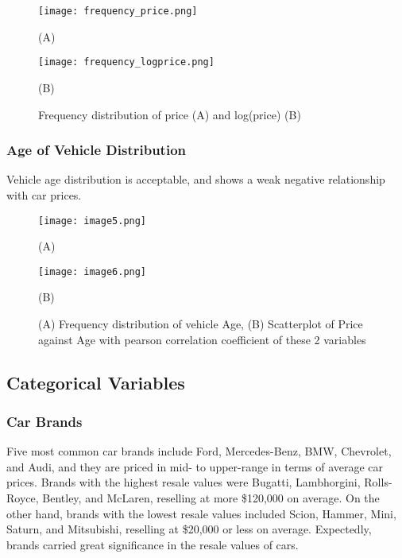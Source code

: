 \documentclass{article}
\begin{document}
\begin{figure}[H]    %
    \centering
    \begin{minipage}[b]{0.45\textwidth}
        \centering
        \texttt{[image: frequency\_price.png]}
        \centerline{(A)}
    \end{minipage}
    \hfill
    \begin{minipage}[b]{0.45\textwidth}
        \centering
        \texttt{[image: frequency\_logprice.png]}
        \centerline{(B)}
    \end{minipage}
    \caption{Frequency distribution of price (A) and log(price) (B)}
    \label{fig:price_dist}
\end{figure}

\subsubsection{Age of Vehicle Distribution}

Vehicle age distribution is acceptable, and shows a weak negative relationship with car prices.

\begin{figure}[H]    %
   \centering
   \begin{minipage}[b]{0.45\textwidth}
       \centering
       \texttt{[image: image5.png]}
       \centerline{(A)}
   \end{minipage}
   \hfill
   \begin{minipage}[b]{0.45\textwidth}
       \centering
       \texttt{[image: image6.png]}  %
       \centerline{(B)}
   \end{minipage}
   \caption{(A) Frequency distribution of vehicle Age, (B) Scatterplot of Price against Age with pearson correlation coefficient of these 2 variables}
   \label{fig:price_dist}
\end{figure}

\subsection{Categorical Variables}
\subsubsection{Car Brands}

Five most common car brands include Ford, Mercedes-Benz, BMW, Chevrolet, and Audi, and they are priced in mid- to upper-range in terms of average car prices. Brands with the highest resale values were Bugatti, Lambhorgini, Rolls-Royce, Bentley, and McLaren, reselling at more \$120,000 on average. On the other hand, brands with the lowest resale values included Scion, Hammer, Mini, Saturn, and Mitsubishi, reselling at \$20,000 or less on average. Expectedly, brands carried great significance in the resale values of cars.
\end{document}
